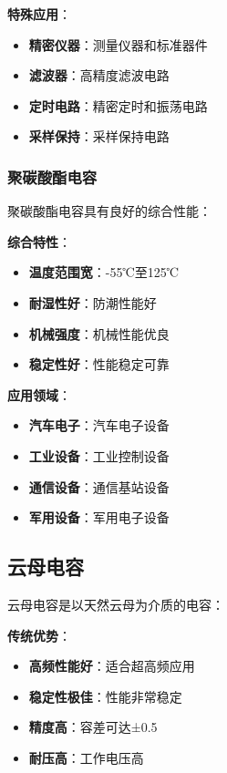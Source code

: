 \documentclass[12pt,UTF8]{ctexbook}
\begin{document}
\textbf{特殊应用}：
\begin{itemize}[leftmargin=3.5em]
    \item \textbf{精密仪器}：测量仪器和标准器件
    \item \textbf{滤波器}：高精度滤波电路
    \item \textbf{定时电路}：精密定时和振荡电路
    \item \textbf{采样保持}：采样保持电路
\end{itemize}

\subsubsection{聚碳酸酯电容}

聚碳酸酯电容具有良好的综合性能：

\textbf{综合特性}：
\begin{itemize}[leftmargin=3.5em]
    \item \textbf{温度范围宽}：-55℃至125℃
    \item \textbf{耐湿性好}：防潮性能好
    \item \textbf{机械强度}：机械性能优良
    \item \textbf{稳定性好}：性能稳定可靠
\end{itemize}

\textbf{应用领域}：
\begin{itemize}[leftmargin=3.5em]
    \item \textbf{汽车电子}：汽车电子设备
    \item \textbf{工业设备}：工业控制设备
    \item \textbf{通信设备}：通信基站设备
    \item \textbf{军用设备}：军用电子设备
\end{itemize}

\subsection{云母电容}

云母电容是以天然云母为介质的电容：

\textbf{传统优势}：
\begin{itemize}[leftmargin=3.5em]
    \item \textbf{高频性能好}：适合超高频应用
    \item \textbf{稳定性极佳}：性能非常稳定
    \item \textbf{精度高}：容差可达±0.5%
    \item \textbf{耐压高}：工作电压高
\end{itemize}
\end{document}
